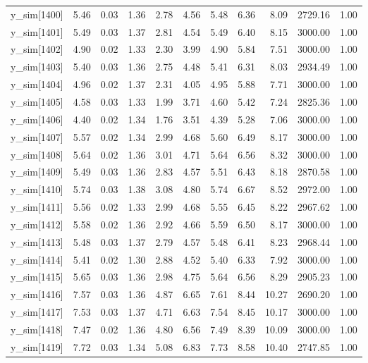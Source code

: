 \begin{table}[ht]
\begin{tabular}{rrrrrrrrrrr}
  y\_sim[1400] & 5.46 & 0.03 & 1.36 & 2.78 & 4.56 & 5.48 & 6.36 & 8.09 & 2729.16 & 1.00 \\ 
  y\_sim[1401] & 5.49 & 0.03 & 1.37 & 2.81 & 4.54 & 5.49 & 6.40 & 8.15 & 3000.00 & 1.00 \\ 
  y\_sim[1402] & 4.90 & 0.02 & 1.33 & 2.30 & 3.99 & 4.90 & 5.84 & 7.51 & 3000.00 & 1.00 \\ 
  y\_sim[1403] & 5.40 & 0.03 & 1.36 & 2.75 & 4.48 & 5.41 & 6.31 & 8.03 & 2934.49 & 1.00 \\ 
  y\_sim[1404] & 4.96 & 0.02 & 1.37 & 2.31 & 4.05 & 4.95 & 5.88 & 7.71 & 3000.00 & 1.00 \\ 
  y\_sim[1405] & 4.58 & 0.03 & 1.33 & 1.99 & 3.71 & 4.60 & 5.42 & 7.24 & 2825.36 & 1.00 \\ 
  y\_sim[1406] & 4.40 & 0.02 & 1.34 & 1.76 & 3.51 & 4.39 & 5.28 & 7.06 & 3000.00 & 1.00 \\ 
  y\_sim[1407] & 5.57 & 0.02 & 1.34 & 2.99 & 4.68 & 5.60 & 6.49 & 8.17 & 3000.00 & 1.00 \\ 
  y\_sim[1408] & 5.64 & 0.02 & 1.36 & 3.01 & 4.71 & 5.64 & 6.56 & 8.32 & 3000.00 & 1.00 \\ 
  y\_sim[1409] & 5.49 & 0.03 & 1.36 & 2.83 & 4.57 & 5.51 & 6.43 & 8.18 & 2870.58 & 1.00 \\ 
  y\_sim[1410] & 5.74 & 0.03 & 1.38 & 3.08 & 4.80 & 5.74 & 6.67 & 8.52 & 2972.00 & 1.00 \\ 
  y\_sim[1411] & 5.56 & 0.02 & 1.33 & 2.99 & 4.68 & 5.55 & 6.45 & 8.22 & 2967.62 & 1.00 \\ 
  y\_sim[1412] & 5.58 & 0.02 & 1.36 & 2.92 & 4.66 & 5.59 & 6.50 & 8.17 & 3000.00 & 1.00 \\ 
  y\_sim[1413] & 5.48 & 0.03 & 1.37 & 2.79 & 4.57 & 5.48 & 6.41 & 8.23 & 2968.44 & 1.00 \\ 
  y\_sim[1414] & 5.41 & 0.02 & 1.30 & 2.88 & 4.52 & 5.40 & 6.33 & 7.92 & 3000.00 & 1.00 \\ 
  y\_sim[1415] & 5.65 & 0.03 & 1.36 & 2.98 & 4.75 & 5.64 & 6.56 & 8.29 & 2905.23 & 1.00 \\ 
  y\_sim[1416] & 7.57 & 0.03 & 1.36 & 4.87 & 6.65 & 7.61 & 8.44 & 10.27 & 2690.20 & 1.00 \\ 
  y\_sim[1417] & 7.53 & 0.03 & 1.37 & 4.71 & 6.63 & 7.54 & 8.45 & 10.17 & 3000.00 & 1.00 \\ 
  y\_sim[1418] & 7.47 & 0.02 & 1.36 & 4.80 & 6.56 & 7.49 & 8.39 & 10.09 & 3000.00 & 1.00 \\ 
  y\_sim[1419] & 7.72 & 0.03 & 1.34 & 5.08 & 6.83 & 7.73 & 8.58 & 10.40 & 2747.85 & 1.00 \\ 

\end{tabular}
\end{table}
